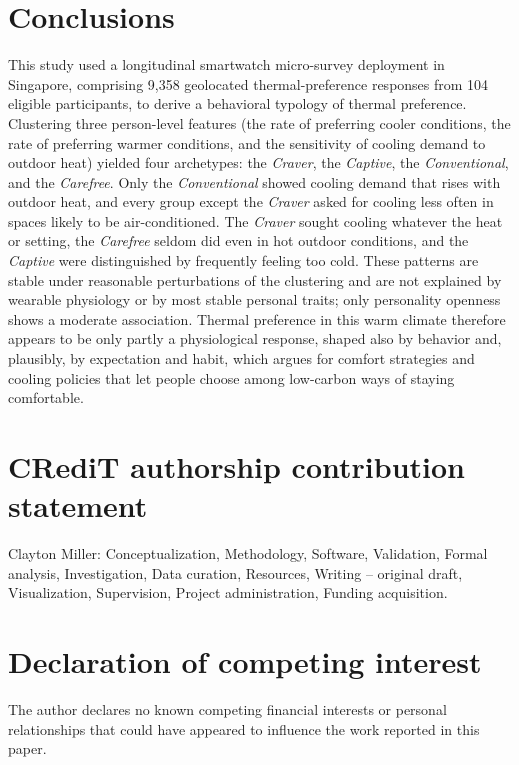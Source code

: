 \documentclass[final,5p,times,twocolumn]{elsarticle}
\begin{document}
\section{Conclusions}\label{sec:conclusions}
This study used a longitudinal smartwatch micro-survey deployment in Singapore, comprising 9{,}358 geolocated thermal-preference responses from 104 eligible participants, to derive a behavioral typology of thermal preference.
Clustering three person-level features (the rate of preferring cooler conditions, the rate of preferring warmer conditions, and the sensitivity of cooling demand to outdoor heat) yielded four archetypes: the \emph{Craver}, the \emph{Captive}, the \emph{Conventional}, and the \emph{Carefree}.
Only the \emph{Conventional} showed cooling demand that rises with outdoor heat, and every group except the \emph{Craver} asked for cooling less often in spaces likely to be air-conditioned.
The \emph{Craver} sought cooling whatever the heat or setting, the \emph{Carefree} seldom did even in hot outdoor conditions, and the \emph{Captive} were distinguished by frequently feeling too cold.
These patterns are stable under reasonable perturbations of the clustering and are not explained by wearable physiology or by most stable personal traits; only personality openness shows a moderate association.
Thermal preference in this warm climate therefore appears to be only partly a physiological response, shaped also by behavior and, plausibly, by expectation and habit, which argues for comfort strategies and cooling policies that let people choose among low-carbon ways of staying comfortable.

\section*{CRediT authorship contribution statement}
Clayton Miller: Conceptualization, Methodology, Software, Validation, Formal analysis, Investigation, Data curation, Resources, Writing -- original draft, Visualization, Supervision, Project administration, Funding acquisition.

\section*{Declaration of competing interest}
The author declares no known competing financial interests or personal relationships that could have appeared to influence the work reported in this paper.
\end{document}
